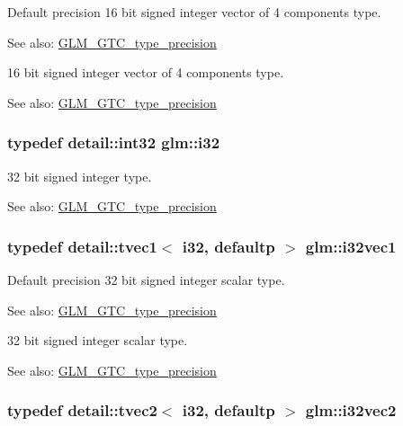 Default precision 16 bit signed integer vector of 4 components type. \begin{Desc}
\item[See also:]\hyperlink{group__gtc__type__precision}{GLM\_\-GTC\_\-type\_\-precision}\end{Desc}
16 bit signed integer vector of 4 components type. \begin{Desc}
\item[See also:]\hyperlink{group__gtc__type__precision}{GLM\_\-GTC\_\-type\_\-precision} \end{Desc}
\hypertarget{group__gtc__type__precision_g1d8ed5c43e91ea7d4528389da4fa9524}{
\subsubsection[i32]{\setlength{\rightskip}{0pt plus 5cm}typedef detail::int32 {\bf glm::i32}}}
\label{group__gtc__type__precision_g1d8ed5c43e91ea7d4528389da4fa9524}


32 bit signed integer type. \begin{Desc}
\item[See also:]\hyperlink{group__gtc__type__precision}{GLM\_\-GTC\_\-type\_\-precision} \end{Desc}
\hypertarget{group__gtc__type__precision_g0d3741d44591183f3dee9500b4ad9ab4}{
\subsubsection[i32vec1]{\setlength{\rightskip}{0pt plus 5cm}typedef detail::tvec1$<$ i32, defaultp $>$ {\bf glm::i32vec1}}}
\label{group__gtc__type__precision_g0d3741d44591183f3dee9500b4ad9ab4}


Default precision 32 bit signed integer scalar type. \begin{Desc}
\item[See also:]\hyperlink{group__gtc__type__precision}{GLM\_\-GTC\_\-type\_\-precision}\end{Desc}
32 bit signed integer scalar type. \begin{Desc}
\item[See also:]\hyperlink{group__gtc__type__precision}{GLM\_\-GTC\_\-type\_\-precision} \end{Desc}
\hypertarget{group__gtc__type__precision_gbb9ac4a278f8a8e3a3928dc9bef81089}{
\subsubsection[i32vec2]{\setlength{\rightskip}{0pt plus 5cm}typedef detail::tvec2$<$ i32, defaultp $>$ {\bf glm::i32vec2}}}
\label{group__gtc__type__precision_gbb9ac4a278f8a8e3a3928dc9bef81089}


